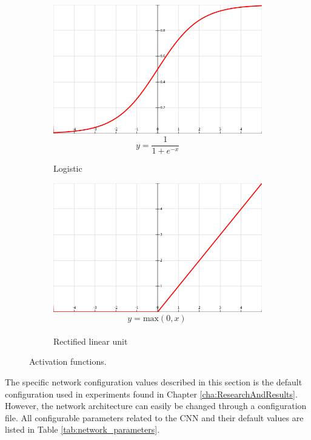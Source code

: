 \begin{figure}[h]
\begin{subfigure}{0.45\textwidth}
\includegraphics[width=\linewidth]{figs/sigmoid2.png}
$$ y = \frac{1}{1+ e^{-x}}$$
\caption{Logistic} \label{fig:activation_sigmoid}
\end{subfigure}
\hspace*{\fill} %
\begin{subfigure}{0.45\textwidth}
\includegraphics[width=\linewidth]{figs/relu2.png}
$$ y = \text{max}(0, x) \frac{}{}$$
\caption{Rectified linear unit} \label{fig:activation_relu}
\end{subfigure}
\hspace*{\fill} %
\caption[Activation functions]{Activation functions.} \label{fig:activation_functions}
\end{figure}


The specific network configuration values described in this section is the default configuration used in experiments found in Chapter \ref{cha:ResearchAndResults}. However, the network architecture can easily be changed through a configuration file. All configurable parameters related to the \ac{CNN} and their default values are listed in Table \ref{tab:network_parameters}.\\

